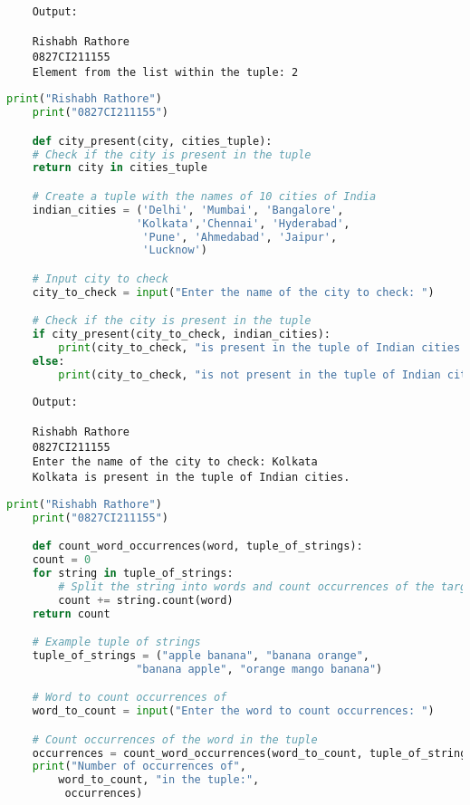 \documentclass{report}
\begin{document}
\begin{verbatim}
	Output:

	Rishabh Rathore
	0827CI211155
	Element from the list within the tuple: 2

\end{verbatim}



\bigskip

\sol 
\begin{lstlisting}[language=Python]
	print("Rishabh Rathore")
	print("0827CI211155")

	def city_present(city, cities_tuple):
    # Check if the city is present in the tuple
    return city in cities_tuple

	# Create a tuple with the names of 10 cities of India
	indian_cities = ('Delhi', 'Mumbai', 'Bangalore', 
					'Kolkata','Chennai', 'Hyderabad',
					 'Pune', 'Ahmedabad', 'Jaipur', 
					 'Lucknow')

	# Input city to check
	city_to_check = input("Enter the name of the city to check: ")

	# Check if the city is present in the tuple
	if city_present(city_to_check, indian_cities):
		print(city_to_check, "is present in the tuple of Indian cities.")
	else:
		print(city_to_check, "is not present in the tuple of Indian cities.")
\end{lstlisting}

\begin{verbatim}
	Output:

	Rishabh Rathore
	0827CI211155
	Enter the name of the city to check: Kolkata
	Kolkata is present in the tuple of Indian cities.

\end{verbatim}


\bigskip

\sol 
\begin{lstlisting}[language=Python]
	print("Rishabh Rathore")
	print("0827CI211155")

	def count_word_occurrences(word, tuple_of_strings):
    count = 0
    for string in tuple_of_strings:
        # Split the string into words and count occurrences of the target word
        count += string.count(word)
    return count

	# Example tuple of strings
	tuple_of_strings = ("apple banana", "banana orange", 
					"banana apple", "orange mango banana")

	# Word to count occurrences of
	word_to_count = input("Enter the word to count occurrences: ")

	# Count occurrences of the word in the tuple
	occurrences = count_word_occurrences(word_to_count, tuple_of_strings)
	print("Number of occurrences of", 
		word_to_count, "in the tuple:",
		 occurrences)

\end{lstlisting}
\end{document}
